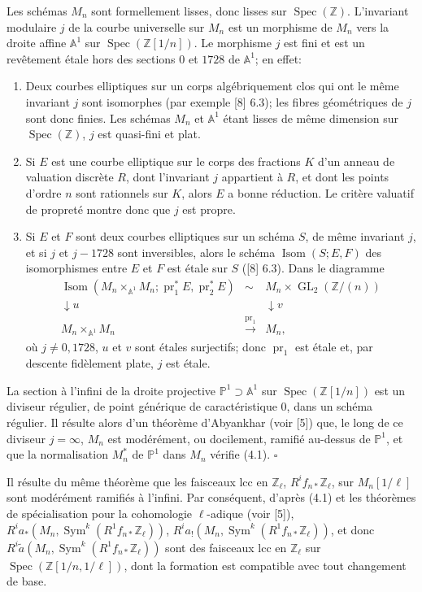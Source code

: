 \documentclass[10pt]{article}
\newcommand{\Z}{\mathbb Z}
\newcommand{\GL}{\operatorname{GL}}
\newcommand{\Isom}{\operatorname{Isom}}
\newcommand{\Sym}{\operatorname{Sym}}
\newcommand{\Spec}{\operatorname{Spec}}
\newcommand{\QED}{\hfill$\square$}
\begin{document}
Les schémas $M_n$ sont formellement lisses, donc lisses sur $\Spec(\Z)$. L'invariant modulaire $j$ de la courbe universelle sur $M_n$ est un morphisme de $M_n$ vers la droite affine $\mathbb A^1$ sur $\Spec(\Z[1/n])$. Le morphisme $j$ est fini et est un revêtement étale hors des sections $0$ et $1728$ de $\mathbb A^1$; en effet:
\begin{enumerate}[label=(\alph*)]
\item Deux courbes elliptiques sur un corps algébriquement clos qui ont le même invariant $j$ sont isomorphes (par exemple [8] 6.3); les fibres géométriques de $j$ sont donc finies. Les schémas $M_n$ et $\mathbb A^1$ étant lisses de même dimension sur $\Spec(\Z)$, $j$ est quasi-fini et plat.
\item Si $E$ est une courbe elliptique sur le corps des fractions $K$ d'un anneau de valuation discrète $R$, dont l'invariant $j$ appartient à $R$, et dont les points d'ordre $n$ sont rationnels sur $K$, alors $E$ a bonne réduction. Le critère valuatif de propreté montre donc que $j$ est propre.
\item Si $E$ et $F$ sont deux courbes elliptiques sur un schéma $S$, de même invariant $j$, et si $j$ et $j-1728$ sont inversibles, alors le schéma $\Isom(S;E,F)$ des isomorphismes entre $E$ et $F$ est étale sur $S$ ([8] 6.3). Dans le diagramme
\[
\begin{array}{ccc}
\Isom(M_n\times_{\mathbb A^1}M_n;\operatorname{pr}_1^*E,\operatorname{pr}_2^*E) & \sim & M_n\times\GL_2(\Z/(n))\\
\downarrow u && \downarrow v\\
M_n\times_{\mathbb A^1}M_n&\xrightarrow{\operatorname{pr}_1}&M_n,
\end{array}
\]
où $j\ne0,1728$, $u$ et $v$ sont étales surjectifs; donc $\operatorname{pr}_1$ est étale et, par descente fidèlement plate, $j$ est étale.
\end{enumerate}
La section à l'infini de la droite projective $\mathbb P^1\supset\mathbb A^1$ sur $\Spec(\Z[1/n])$ est un diviseur régulier, de point générique de caractéristique $0$, dans un schéma régulier. Il résulte alors d'un théorème d'Abyankhar (voir [5]) que, le long de ce diviseur $j=\infty$, $M_n$ est modérément, ou docilement, ramifié au-dessus de $\mathbb P^1$, et que la normalisation $M_n^*$ de $\mathbb P^1$ dans $M_n$ vérifie (4.1). \QED

Il résulte du même théorème que les faisceaux lcc en $\Z_\ell$, $R^if_{n*}\Z_\ell$, sur $M_n[1/\ell]$ sont modérément ramifiés à l'infini. Par conséquent, d'après (4.1) et les théorèmes de spécialisation pour la cohomologie $\ell$-adique (voir [5]), $R^ia_*(M_n,\Sym^k(R^1f_{n*}\Z_\ell))$, $R^ia_!(M_n,\Sym^k(R^1f_{n*}\Z_\ell))$, et donc $R^i\widetilde a(M_n,\Sym^k(R^1f_{n*}\Z_\ell))$ sont des faisceaux lcc en $\Z_\ell$ sur $\Spec(\Z[1/n,1/\ell])$, dont la formation est compatible avec tout changement de base.
\end{document}

